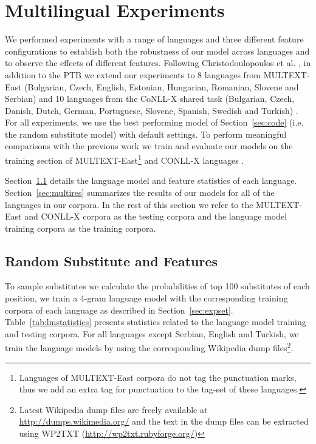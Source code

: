 \section{Multilingual Experiments}
\label{sec:multilang}
\noindent We performed experiments with a range of languages and three
different feature configurations to establish both the robustness of
our model across languages and to observe the effects of different
features.  Following Christodoulopoulos et
al. , in
addition to the PTB we extend our experiments to 8 languages from
MULTEXT-East (Bulgarian, Czech, English, Estonian, Hungarian,
Romanian, Slovene and Serbian) \cite{citeulike:5820223} and 10
languages from the CoNLL-X shared task (Bulgarian, Czech, Danish,
Dutch, German, Portuguese, Slovene, Spanish, Swedish and Turkish)
\cite{Buchholz:2006:CST:1596276.1596305}.  For all experiments, we use
the best performing model of Section~\ref{sec:code} (i.e. the random
substitute model) with default settings.  To perform meaningful
comparisons with the previous work we train and evaluate our models on
the training section of MULTEXT-East\footnote{Languages of
  MULTEXT-East corpora do not tag the punctuation marks, thus we add
  an extra tag for punctuation to the tag-set of these languages.} and
CONLL-X languages \cite{Lee:2010:STU:1870658.1870741}.

Section~\ref{sec:multivecfeat} details the language model and feature
statistics of each language.  Section~\ref{sec:multires} summarizes
the results of our models for all of the languages in our corpora.  In
the rest of this section we refer to the MULTEXT-East and CONLL-X
corpora as the testing corpora and the language model training corpora
as the training corpora.

\subsection{Random Substitute and Features}
\label{sec:multivecfeat}
 

To sample substitutes we calculate the probabilities of top 100
substitutes of each position, we train a 4-gram language model with
the corresponding training corpora of each language as described in
Section~\ref{sec:expset}.  Table~\ref{tab:lmstatistics} presents
statistics related to the language model training and testing corpora.
For all languages except Serbian, English and Turkish, we train the
language models by using the corresponding Wikipedia dump
files\footnote{Latest Wikipedia dump files are freely available at
  \url{http://dumps.wikimedia.org/} and the text in the dump files can
  be extracted using WP2TXT (\url{http://wp2txt.rubyforge.org/})}.

